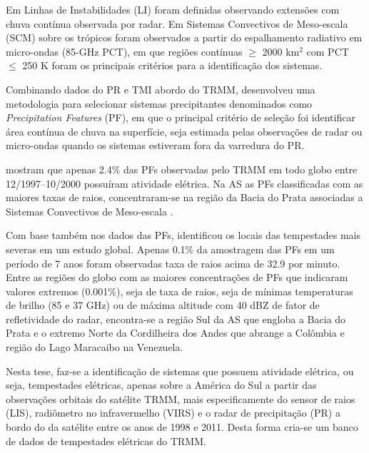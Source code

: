 Em  Linhas de Instabilidades (LI) foram definidas observando extensões com chuva contínua observada por radar. Em  Sistemas Convectivos de Meso-escala (SCM) sobre os trópicos foram observados a partir do espalhamento radiativo em micro-ondas (85-GHz PCT), em que regiões contínuas $\geqslant$ 2000 km$^2$ com PCT $\leqslant$ 250 K foram os principais critérios para a identificação dos sistemas.


Combinando dados do PR e TMI abordo do TRMM,  desenvolveu uma metodologia para selecionar sistemas precipitantes denominados como \textit{Precipitation Features} (PF), em que o principal critério de seleção foi identificar área contínua de chuva na superfície, seja estimada pelas observações de radar ou micro-ondas quando os sistemas estiveram fora da varredura do PR.



 mostram que apenas 2.4\% das PFs observadas pelo TRMM em todo globo entre 12/1997--10/2000 possuíram atividade elétrica. Na AS as PFs classificadas com as maiores taxas de raios, concentraram-se na região da Bacia do Prata associadas a Sistemas Convectivos de Meso-escala \cite{Velasco1987,Durkee2009}.   


Com base também nos dados das PFs,   identificou os locais das tempestades mais severas em um estudo global. Apenas 0.1\% da amostragem das PFs em um período de 7 anos foram observadas taxa de raios acima de 32.9 por minuto.  Entre as regiões do globo com as maiores concentrações de PFs que indicaram valores extremos (0.001\%), seja de taxa de raios, seja de mínimas temperaturas de brilho (85 e 37 GHz) ou de máxima altitude com 40 dBZ de fator de refletividade do radar, encontra-se a região Sul da AS que engloba a Bacia do Prata e o extremo Norte da Cordilheira dos Andes que abrange a Colômbia e região do Lago Maracaibo na Venezuela. 

Nesta tese, faz-se a identificação de sistemas que possuem atividade elétrica, ou seja, tempestades elétricas, apenas sobre a América do Sul  a partir das observações orbitais do satélite TRMM, mais especificamente do sensor de raios (LIS), radiômetro no infravermelho (VIRS) e o radar de precipitação (PR) a bordo do da satélite entre os anos de 1998 e 2011. Desta forma cria-se um banco de dados de tempestades elétricas do TRMM.

